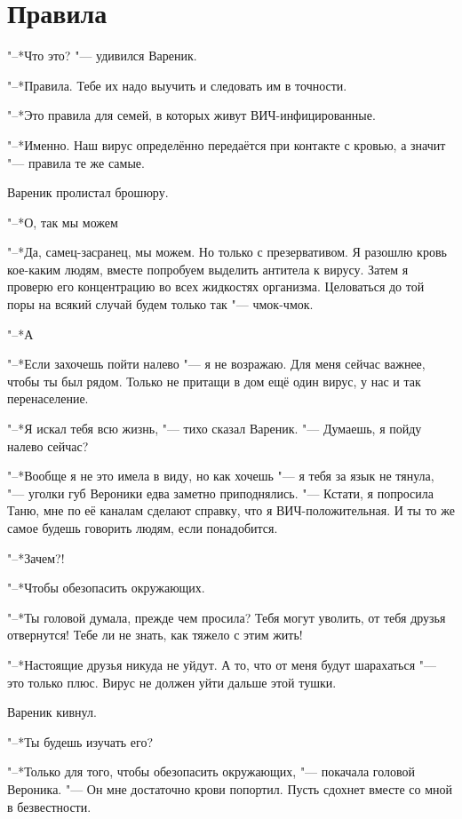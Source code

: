 \section{Правила}

"--*Что это? "--- удивился Вареник.

"--*Правила.
Тебе их надо выучить и следовать им в точности.

"--*Это правила для семей, в которых живут ВИЧ-инфицированные.

"--*Именно.
Наш вирус определённо передаётся при контакте с кровью, а значит "--- правила те же самые.

Вареник пролистал брошюру.

"--*О, так мы можем\ldotsq

"--*Да, самец-засранец, мы можем.
Но только с презервативом.
Я разошлю кровь кое-каким людям, вместе попробуем выделить антитела к вирусу.
Затем я проверю его концентрацию во всех жидкостях организма.
Целоваться до той поры на всякий случай будем только так "--- чмок-чмок.

"--*А\ldotst

"--*Если захочешь пойти налево "--- я не возражаю.
Для меня сейчас важнее, чтобы ты был рядом.
Только не притащи в дом ещё один вирус, у нас и так перенаселение.

"--*Я искал тебя всю жизнь, "--- тихо сказал Вареник.
"--- Думаешь, я пойду налево сейчас?

"--*Вообще я не это имела в виду, но как хочешь "--- я тебя за язык не тянула, "--- уголки губ Вероники едва заметно приподнялись.
"--- Кстати, я попросила Таню, мне по её каналам сделают справку, что я ВИЧ-положительная.
И ты то же самое будешь говорить людям, если понадобится.

"--*Зачем?!

"--*Чтобы обезопасить окружающих.

"--*Ты головой думала, прежде чем просила?
Тебя могут уволить, от тебя друзья отвернутся!
Тебе ли не знать, как тяжело с этим жить!

"--*Настоящие друзья никуда не уйдут.
А то, что от меня будут шарахаться "--- это только плюс.
Вирус не должен уйти дальше этой тушки.

Вареник кивнул.

"--*Ты будешь изучать его?

"--*Только для того, чтобы обезопасить окружающих, "--- покачала головой Вероника.
"--- Он мне достаточно крови попортил.
Пусть сдохнет вместе со мной в безвестности.

